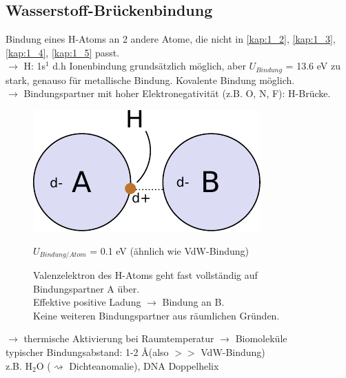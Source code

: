 \subsection{Wasserstoff-Brückenbindung} %
\label{kap:1_6}
Bindung eines H-Atoms an 2 andere Atome, die nicht in \ref{kap:1_2}, \ref{kap:1_3}, \ref{kap:1_4}, \ref{kap:1_5} passt.\\
$\rightarrow$ H: 1s$^1$ d.h Ionenbindung grundsätzlich möglich, aber $U_{Bindung}$ = 13.6 eV zu stark, genauso für metallische Bindung. Kovalente Bindung möglich. \\
$\rightarrow$ Bindungspartner mit hoher Elektronegativität (z.B. O, N, F): H-Brücke.
\begin{figure}[H]
	\centering
	\includegraphics{figures/1_6Wasserstoff.pdf}
	\caption{Valenzelektron des H-Atoms geht fast vollständig auf Bindungspartner A über.\\
	Effektive positive Ladung $\rightarrow$ Bindung an B.\\
	Keine weiteren Bindungspartner aus räumlichen Gründen.}
	$U_{Bindung / Atom}$ = 0.1 eV (ähnlich wie VdW-Bindung)
	\label{}
\end{figure}

$\rightarrow$ thermische Aktivierung bei Raumtemperatur $\rightarrow$ Biomoleküle\\
typischer Bindungsabstand: 1-2 \AA (also $>>$ VdW-Bindung)\\
z.B. H$_2$O ($\rightsquigarrow$ Dichteanomalie), DNA Doppelhelix
